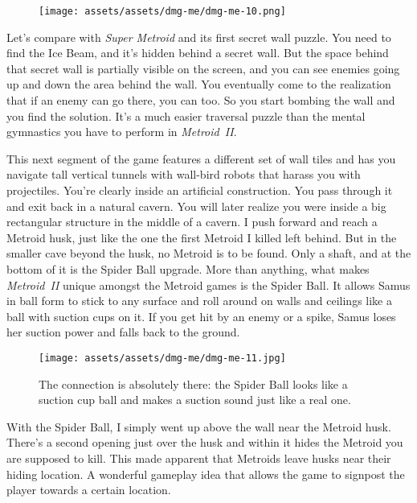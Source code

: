 \documentclass{book}
\begin{document}
\begin{figure}[hbt]
\vskip 10pt
\centering \texttt{[image: assets/assets/dmg-me/dmg-me-10.png]}
\vskip 6pt
\end{figure}

Let’s compare with \emph{Super Metroid} and its first secret wall puzzle. You need to find the Ice Beam, and it’s hidden behind a secret wall. But the space behind that secret wall is partially visible on the screen, and you can see enemies going up and down the area behind the wall. You eventually come to the realization that if an enemy can go there, you can too. So you start bombing the wall and you find the solution. It’s a much easier traversal puzzle than the mental gymnastics you have to perform in \emph{Metroid~II}.

This next segment of the game features a different set of wall tiles and has you navigate tall vertical tunnels with wall-bird robots that harass you with projectiles. You’re clearly inside an artificial construction. You pass through it and exit back in a natural cavern. You will later realize you were inside a big rectangular structure in the middle of a cavern. I push forward and reach a Metroid husk, just like the one the first Metroid I killed left behind. But in the smaller cave beyond the husk, no Metroid is to be found. Only a shaft, and at the bottom of it is the Spider Ball upgrade. More than anything, what makes \emph{Metroid~II} unique amongst the Metroid games is the Spider Ball. It allows Samus in ball form to stick to any surface and roll around on walls and ceilings like a ball with suction cups on it. If you get hit by an enemy or a spike, Samus loses her suction power and falls back to the ground.

\begin{figure}[hbt]
\vskip 10pt
\centering \texttt{[image: assets/assets/dmg-me/dmg-me-11.jpg]}\par\pagetwodescription The connection is absolutely there: the Spider Ball looks like a suction cup ball and makes a suction sound just like a real one.
\vskip 6pt
\end{figure}

With the Spider Ball, I simply went up above the wall near the Metroid husk. There’s a second opening just over the husk and within it hides the Metroid you are supposed to kill. This made apparent that Metroids leave husks near their hiding location. A wonderful gameplay idea that allows the game to signpost the player towards a certain location.
\end{document}
